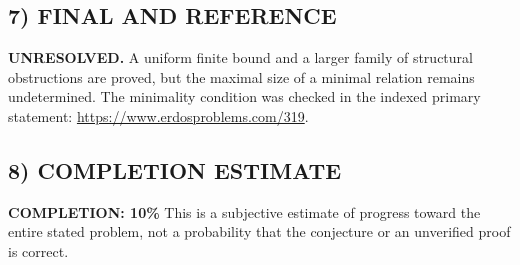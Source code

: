 \subsection*{7) FINAL AND REFERENCE}
\textbf{UNRESOLVED.} A uniform finite bound and a larger family of structural
obstructions are proved, but the maximal size of a minimal relation remains
undetermined. The minimality condition was checked in the indexed primary
statement: \url{https://www.erdosproblems.com/319}.

\subsection*{8) COMPLETION ESTIMATE}
\textbf{COMPLETION: 10\%}
This is a subjective estimate of progress toward the entire stated problem, not a probability that the conjecture or an unverified proof is correct.
